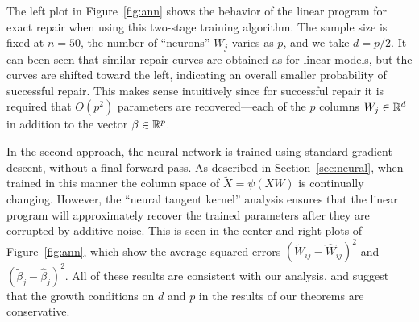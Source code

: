 The left plot in Figure~\ref{fig:ann} shows the behavior of the linear program for exact repair when using this two-stage training algorithm.
The sample size is fixed at $n=50$, the number of ``neurons'' $W_j$ varies as $p$, and we take $d=p/2$. It can been seen that similar repair curves are obtained as for linear models, but the curves are shifted toward the left, indicating an overall smaller probability of successful repair. This makes sense intuitively since for successful repair it is required that
$O(p^2)$ parameters are recovered---each of the $p$ columns $W_j\in\mathbb{R}^d$ in addition to the vector $\beta\in\mathbb{R}^p$.

In the second approach, the neural network is trained using standard gradient descent, without a final forward pass. As described in
Section~\ref{sec:neural}, when trained in this manner the column space of $\tilde X = \psi(X W)$ is continually changing. However,
the ``neural tangent kernel'' analysis ensures that the linear program will approximately recover the trained parameters after they are corrupted by additive noise. This is seen in the center and right plots of Figure~\ref{fig:ann}, which show the
average squared errors $(\tilde W_{ij} - \hat W_{ij})^2$ and $(\tilde \beta_j - \hat\beta_j)^2$. All of these results are consistent with our analysis, and suggest that the growth conditions on $d$ and $p$ in the results of our theorems are conservative.

